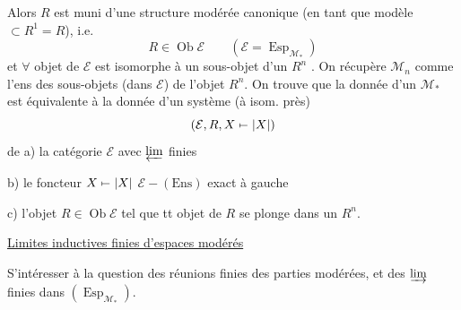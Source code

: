 Alors $R$ est muni d'une structure modérée canonique (en tant que modèle $\subset R^1=R$), i.e.
\[
 R\in\operatorname{Ob}\mathcal E\qquad(\mathcal E=\operatorname{Esp}_{\mathcal M_*})
\]
et $\forall$ objet de $\mathcal E$ est isomorphe à un sous-objet d'un $R^n$ . On récupère $\mathcal M_n$ comme l'ens des  sous-objets (dans $\mathcal E$) de l'objet $R^n$. On trouve que la donnée d'un $\mathcal M_*$ est équivalente à la donnée d'un système (à isom. près)
\[
 (\mathcal E,R,X\mathrel{\mapstochar\relbar}|X|)
\]
de a) la catégorie $\mathcal E$ avec $\varprojlim$ finies

b) le foncteur $X\mathrel{\mapstochar\relbar}|X|$ $\mathcal E\mathbin{-}(\mathrm{Ens})$ exact à gauche

c) l'objet $R\in\operatorname{Ob}\mathcal E$ tel que tt objet de $R$ se plonge dans un $R^n$.



\uline{Limites inductives finies d'espaces modérés}

S'intéresser à la question des réunions finies des parties modérées, et des $\varinjlim$ finies dans $(\operatorname{Esp}_{\mathcal M_*})$.

